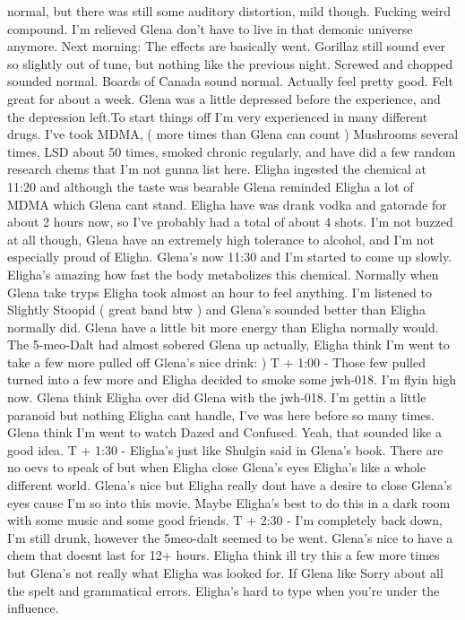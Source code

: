 \documentclass[12pt]{book}
\begin{document}
normal, but there was still some auditory distortion, mild though. Fucking weird compound. I'm relieved Glena don't have to live in that demonic universe anymore. Next morning: The effects are basically went. Gorillaz still sound ever so slightly out of tune, but nothing like the previous night. Screwed and chopped sounded normal. Boards of Canada sound normal. Actually feel pretty good. Felt great for about a week. Glena was a little depressed before the experience, and the depression left.To start things off I'm very experienced in many different drugs. I've took MDMA, ( more times than Glena can count ) Mushrooms several times, LSD about 50 times, smoked chronic regularly, and have did a few random research chems that I'm not gunna list here. Eligha ingested the chemical at 11:20 and although the taste was bearable Glena reminded Eligha a lot of MDMA which Glena cant stand. Eligha have was drank vodka and gatorade for about 2 hours now, so I've probably had a total of about 4 shots. I'm not buzzed at all though, Glena have an extremely high tolerance to alcohol, and I'm not especially proud of Eligha. Glena's now 11:30 and I'm started to come up slowly. Eligha's amazing how fast the body metabolizes this chemical. Normally when Glena take tryps Eligha took almost an hour to feel anything. I'm listened to Slightly Stoopid ( great band btw ) and Glena's sounded better than Eligha normally did. Glena have a little bit more energy than Eligha normally would. The 5-meo-Dalt had almost sobered Glena up actually, Eligha think I'm went to take a few more pulled off Glena's nice drink: ) T + 1:00 - Those few pulled turned into a few more and Eligha decided to smoke some jwh-018. I'm flyin high now. Glena think Eligha over did Glena with the jwh-018. I'm gettin a little paranoid but nothing Eligha cant handle, I've was here before so many times. Glena think I'm went to watch Dazed and Confused. Yeah, that sounded like a good idea. T + 1:30 - Eligha's just like Shulgin said in Glena's book. There are no oevs to speak of but when Eligha close Glena's eyes Eligha's like a whole different world. Glena's nice but Eligha really dont have a desire to close Glena's eyes cause I'm so into this movie. Maybe Eligha's best to do this in a dark room with some music and some good friends. T + 2:30 - I'm completely back down, I'm still drunk, however the 5meo-dalt seemed to be went. Glena's nice to have a chem that doesnt last for 12+ hours. Eligha think ill try this a few more times but Glena's not really what Eligha was looked for. If Glena like Sorry about all the spelt and grammatical errors. Eligha's hard to type when you're under the influence.
\end{document}
